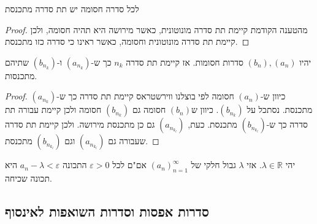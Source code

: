 \documentclass{tstextbook}
\begin{document}
\begin{theorem}
לכל סדרה חסומה יש תת סדרה מתכנסת

\end{theorem}
\begin{proof}
מהטענה הקודמת קיימת תת סדרה מונוטונית, כאשר מירושה היא תהיה חסומה, ולכן קיימת תת סדרה מונוטונית וחסומה, כאשר ראינו כי סדרה כזו מתכנסת.

\end{proof}
\begin{proposition}
יהיו \((b_{n}),(a_{n})\) סדרות חסומות. אז קיימת תת סדרה \(n_{k}\) כך ש-\((a_{n_{k}})\) ו-\((b_{n_{k}})\) שתיהם מתכנסות.

\end{proposition}
\begin{proof}
כיוון ש-\((a_{n})\) חסומה לפי בוצלנו ווירשטראס קיימת תת סדרה כך ש-\((a_{n_{k}})\) מתכנסת. נסתכל על \((b_{n_{k}})\). כיוון ש\((b_{n})\) חסומה גם \((b_{n_{k}})\) חסומה ולכן קיימת עבורה תת סדרה כך ש-\((b_{n_{k_{l}}})\) מתכנסת. כעת, \((a_{n_{k_{l}}})\) גם כן מתכנסת מירושה. ולכן קיימת תת סדרה שעבורה גם \((a_{n_{k_{l}}})\) וגם \((b_{n_{k_{l}}})\) מתכנסת.

\end{proof}
\begin{proposition}
יהי \(\lambda \in \mathbb{R}\). אזי \(\lambda\) גבול חלקי של \((a_n)_{n=1}^\infty\) אם"ם לכל \(\varepsilon>0\) התכונה \(a_{n}-\lambda<\varepsilon\) היא תכונה שכיחה.

\end{proposition}
\subsection{סדרות אפסות וסדרות השואפות לאינסוף}
\end{document}

